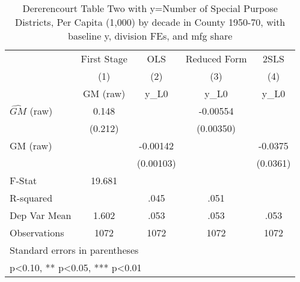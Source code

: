 \begin{table}[htbp]\centering
\def\sym#1{\ifmmode^{#1}\else\(^{#1}\)\fi}
\caption{Dererencourt Table Two with y=Number of Special Purpose Districts, Per Capita (1,000) by decade in County 1950-70, with baseline y, division FEs, and mfg share}
\begin{tabular}{l*{4}{c}}
\toprule
                    & First Stage   &         OLS   &Reduced Form   &        2SLS   \\
                    &\multicolumn{1}{c}{(1)}&\multicolumn{1}{c}{(2)}&\multicolumn{1}{c}{(3)}&\multicolumn{1}{c}{(4)}\\
                    &\multicolumn{1}{c}{GM  (raw)}&\multicolumn{1}{c}{y\_L0}&\multicolumn{1}{c}{y\_L0}&\multicolumn{1}{c}{y\_L0}\\
\midrule
$\hat{GM}$ (raw)    &       0.148   &               &    -0.00554   &               \\
                    &     (0.212)   &               &   (0.00350)   &               \\
\addlinespace
GM  (raw)           &               &    -0.00142   &               &     -0.0375   \\
                    &               &   (0.00103)   &               &    (0.0361)   \\
\midrule
F-Stat              &      19.681   &               &               &               \\
R-squared           &               &        .045   &        .051   &               \\
Dep Var Mean        &       1.602   &        .053   &        .053   &        .053   \\
Observations        &        1072   &        1072   &        1072   &        1072   \\
\bottomrule
\multicolumn{5}{l}{\footnotesize Standard errors in parentheses}\\
\multicolumn{5}{l}{\footnotesize * p<0.10, ** p<0.05, *** p<0.01}\\
\end{tabular}
\end{table}
